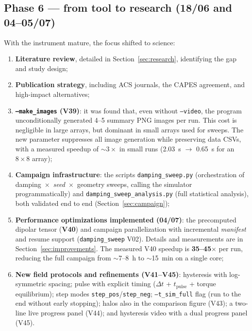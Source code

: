\documentclass[11pt,a4paper]{article}
\newcommand{\code}[1]{\texttt{#1}}
\begin{document}
\subsection{Phase 6 --- from tool to research (18/06 and 04--05/07)}

With the instrument mature, the focus shifted to science:

\begin{enumerate}
\item \textbf{Literature review}, detailed in Section~\ref{sec:research}, identifying the gap and study design;
\item \textbf{Publication strategy}, including ACS journals, the CAPES agreement, and high-impact alternatives;
\item \textbf{\code{--make\_images} (V39)}: it was found that, even without \code{--video}, the program unconditionally generated 4--5 summary PNG images per run. This cost is negligible in large arrays, but dominant in small arrays used for sweeps. The new parameter suppresses all image generation while preserving data CSVs, with a measured speedup of $\sim 3\times$ in small runs (2.03~s $\to$ 0.65~s for an $8\times8$ array);
\item \textbf{Campaign infrastructure}: the scripts \code{damping\_sweep.py} (orchestration of damping~$\times$~\emph{seed}~$\times$~geometry sweeps, calling the simulator programmatically) and \code{damping\_sweep\_analysis.py} (full statistical analysis), both validated end to end (Section~\ref{sec:campaign});
\item \textbf{Performance optimizations implemented (04/07)}: the precomputed dipolar tensor (\textbf{V40}) and campaign parallelization with incremental \emph{manifest} and resume support (\code{damping\_sweep} V02). Details and measurements are in Section~\ref{sec:improvements}. The measured V40 speedup is \textbf{35--45$\times$} per run, reducing the full campaign from $\sim$7--8~h to $\sim$15~min on a single core;
\item \textbf{New field protocols and refinements (V41--V45)}: hysteresis with log-symmetric spacing; pulse with explicit timing ($\Delta t$ + $t_{\mathrm{pulse}}$ + torque equilibrium); step modes \code{step\_pos}/\code{step\_neg}; \code{--t\_sim\_full} flag (run to the end without early stopping); halos also in the comparison figure (V43); a two-line live progress panel (V44); and hysteresis video with a dual progress panel (V45).

\end{enumerate}
\end{document}
